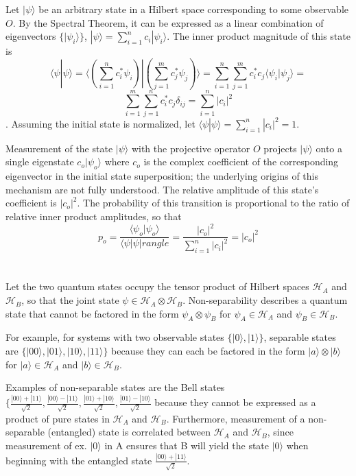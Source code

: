 \documentclass{article}
\begin{document}
\section{}

Let $|\psi\rangle$ be an arbitrary state in a Hilbert space corresponding to some observable $O$. By the Spectral Theorem, it can be expressed as a linear combination of eigenvectors $\{|\psi_i\rangle\}$, $|\psi\rangle=\sum_{i=1}^{n}c_i|\psi_i\rangle$. The inner product magnitude of this state is $$\langle\psi |\psi\rangle=\langle(\sum_{i=1}^{n}c_i^{*}\psi_i) | (\sum_{j=1}^{m}c_j^{*}\psi_j)\rangle=\sum_{i=1}^{n}\sum_{j=1}^{m}c_i^{*}c_j\langle \psi_i|\psi_j\rangle=$$
$$\sum_{i=1}^{m}\sum_{j=1}^{n}c_i^{*}c_j\delta_{ij}=\sum_{i=1}^{n}|c_i|^2$$.
Assuming the initial state is normalized, let $\langle\psi|\psi\rangle=\sum_{i=1}^{n}|c_i|^2=1$.

Measurement of the state $|\psi\rangle$ with the projective operator $O$ projects $|\psi\rangle$ onto a single eigenstate $c_o|\psi_o\rangle$ where $c_o$ is the complex coefficient of the corresponding eigenvector in the initial state superposition; the underlying origins of this mechanism are not fully understood. The relative amplitude of this state's coefficient is $|c_o|^2$. The probability of this transition is proportional to the ratio of relative inner product amplitudes, so that $$p_o=\frac{\langle\psi_o|\psi_o\rangle}{\langle\psi|\psi|rangle}=\frac{|c_o|^2}{\sum_{i=1}^{n}|c_i|^2}=\boxed{|c_o|^2}$$


\section{}

Let the two quantum states occupy the tensor product of Hilbert spaces $\mathcal{H}_A$ and $\mathcal{H}_B$, so that the joint state $\psi\in\mathcal{H}_A\otimes\mathcal{H}_B$. Non-separability describes a quantum state that cannot be factored in the form $\psi_A\otimes\psi_B$ for $\psi_A\in\mathcal{H}_A$ and $\psi_B\in\mathcal{H}_B$.

For example, for systems with two observable states $\{|0\rangle, |1\rangle\}$, separable states are $\{|00\rangle,|01\rangle,|10\rangle,|11\rangle\}$ because they can each be factored in the form $|a\rangle\otimes|b\rangle$ for $|a\rangle\in\mathcal{H}_A$ and $|b\rangle\in\mathcal{H}_B$.

Examples of non-separable states are the Bell states $\{\frac{|00\rangle+|11\rangle}{\sqrt{2}},\frac{|00\rangle-|11\rangle}{\sqrt{2}},\frac{|01\rangle+|10\rangle}{\sqrt{2}},\frac{|01\rangle-|10\rangle}{\sqrt{2}}$ because they cannot be expressed as a product of pure states in $\mathcal{H}_A$ and $\mathcal{H}_B$. Furthermore, measurement of a non-separable (entangled) state is correlated between $\mathcal{H}_A$ and $\mathcal{H}_B$, since measurement of ex. $|0\rangle$ in A ensures that B will yield the state $|0\rangle$ when beginning with the entangled state $\frac{|00\rangle+|11\rangle}{\sqrt{2}}$.



\end{document}
